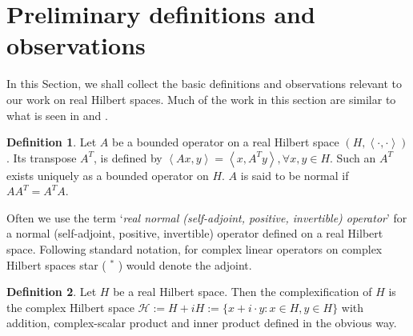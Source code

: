 \documentclass[12pt,a4paper,twoside]{article}
\numberwithin{equation}{section}
\theoremstyle{definition}  %
\newtheorem{defn}{Definition}[section]
\theoremstyle{plain}  %
\theoremstyle{remark} %
\begin{document}





\section{Preliminary definitions and observations}
  In this Section, we shall collect the basic definitions and observations relevant to our work on real Hilbert spaces. Much of the work in this section are similar to what is seen in \cite{Wong69} and \cite{Goo72}.
\begin{defn}
Let $A$ be a bounded operator on a real Hilbert space $(H,\left\langle \cdot,\cdot  \right\rangle)$. Its transpose $A^{T}$, is defined by $\left\langle Ax,y \right\rangle = \left\langle x,A^{T}y \right\rangle, \forall x,y \in H$. Such an $A^{T}$ exists uniquely as a bounded operator on $H$. $A$ is said to be normal if $AA^{T} = A^{T}A$.
\end{defn}
Often we use the term `\emph{real normal (self-adjoint, positive, invertible) operator}' for a normal (self-adjoint, positive, invertible) operator defined on a real Hilbert space. Following standard notation, for complex linear operators on complex Hilbert spaces  star ( $^*$ )  would denote the adjoint.
\begin{defn}
  Let $H$ be a real Hilbert space. Then the complexification of $H$ is the complex Hilbert space $\mathcal{H} :=H+iH:= \{x+i \cdot y:x\in H,y\in H\}$ with  addition, complex-scalar product and inner product defined in the obvious way.
\end{defn}
\end{document}
